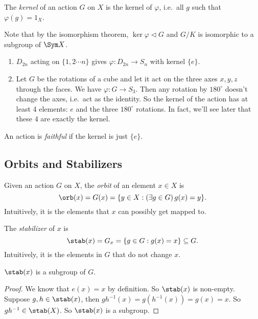 \documentclass[a4paper]{article}
\begin{document}
\begin{defi}
  The \emph{kernel} of an action $G$ on $X$ is the kernel of $\varphi$, i.e.\ all $g$ such that $\varphi(g) = 1_X$.
\end{defi}
Note that by the isomorphism theorem, $\ker \varphi\lhd G$ and $G/K$ is isomorphic to a subgroup of $\Sym X$.

\begin{eg}\leavevmode
  \begin{enumerate}
    \item $D_{2n}$ acting on $\{1, 2\cdots n\}$ gives $\varphi: D_{2n}\to S_n$ with kernel $\{e\}$.
    \item Let $G$ be the rotations of a cube and let it act on the three axes $x, y, z$ through the faces. We have $\varphi: G\to S_3$. Then any rotation by $180^\circ$ doesn't change the axes, i.e.\ act as the identity. So the kernel of the action has at least 4 elements: $e$ and the three $180^\circ$ rotations. In fact, we'll see later that these 4 are exactly the kernel.
  \end{enumerate}
\end{eg}

\begin{defi}
  An action is \emph{faithful} if the kernel is just $\{e\}$.
\end{defi}

\subsection{Orbits and Stabilizers}
\begin{defi}
  Given an action $G$ on $X$, the \emph{orbit} of an element $x\in X$ is
  \[
    \orb (x) = G(x) = \{y\in X: (\exists g\in G)\,g(x) = y\}.
  \]
  Intuitively, it is the elements that $x$ can possibly get mapped to.
\end{defi}
\begin{defi}
  The \emph{stabilizer} of $x$ is
  \[
    \stab(x) = G_x = \{g\in G: g(x) = x\}\subseteq G.
  \]
  Intuitively, it is the elements in $G$ that do not change $x$.
\end{defi}

\begin{lemma}
  $\stab(x)$ is a subgroup of $G$.
\end{lemma}

\begin{proof}
  We know that $e(x) = x$ by definition. So $\stab(x)$ is non-empty. Suppose $g, h\in \stab(x)$, then $gh^{-1}(x) = g(h^{-1}(x)) = g(x) = x$. So $gh^{-1}\in \stab (X)$. So $\stab (x)$ is a subgroup.
\end{proof}
\end{document}
